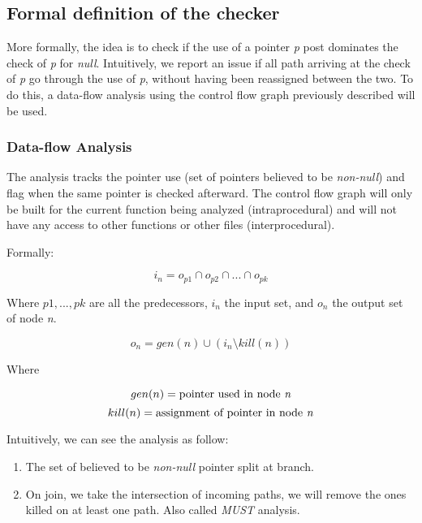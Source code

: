 \subsection{Formal definition of the checker}
\label{subsec:checker_formal_definition}
More formally, the idea is to check if the use of a pointer \emph{p} post dominates the check of \emph{p} for \emph{null}.
Intuitively, we report an issue if all path arriving at the check of \emph{p} go through the use of \emph{p}, without having been reassigned between the two. 
To do this, a data-flow analysis using the control flow graph previously described will be used.

\subsubsection{Data-flow Analysis}
\label{subsubsec:data_flow_analysis}

The analysis tracks the pointer use (set of pointers believed to be \emph{non-null}) and flag when the same pointer is checked afterward.
The control flow graph will only be built for the current function being analyzed (intraprocedural) and will not have any access to other functions or other files (interprocedural).

Formally:

\begin{equation}\label{eqn:dataflow1}
i_{n} = o_{p1}  \cap   o_{p2}  \cap  ... \cap   o_{pk}
\end{equation}

Where $p1, ..., pk$ are all the predecessors, $i_{n}$ the input set, and  $o_{n}$ the output set of node \emph{n}.

\begin{equation}\label{eqn:dataflow2}
o_{n} = gen(n)  \cup   (i_{n} \setminus kill(n))
\end{equation}

Where

\begin{equation}\label{eqn:dataflow3}
gen(n) =\text{pointer used in node \emph{n}}
\end{equation}
\begin{equation}\label{eqn:dataflow4}
kill(n) = \text{assignment of pointer in node \emph{n}}
\end{equation}

Intuitively, we can see the analysis as follow:
\begin{enumerate}
	\item The set of believed to be \emph{non-null} pointer split at branch. \newline 
	\item On join, we take the intersection of incoming paths, we will remove the ones killed on at least one path. Also called \emph{MUST} analysis. \newline 
\end{enumerate}

